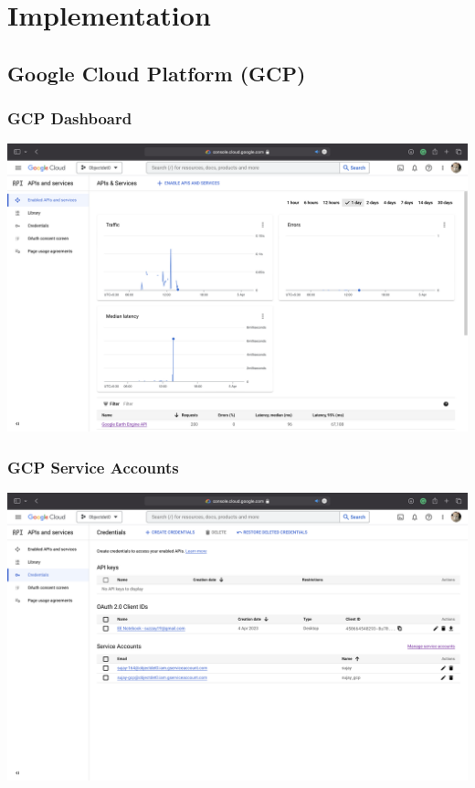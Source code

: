 \chapter{Implementation}

\section{Google Cloud Platform (GCP)}
\subsection{GCP Dashboard}
\includegraphics[scale=0.34]{screenshts/1.png}
\subsection{GCP Service Accounts}
\includegraphics[scale=0.3]{screenshts/2.png}
